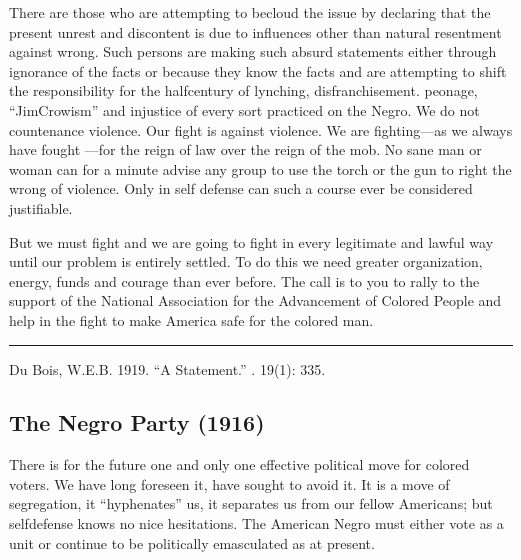 \documentclass[letterpaper,10pt,english]{jupyterBook}
\begin{document}
\sphinxAtStartPar
There are those who are attempting to becloud the issue by declaring that the present unrest and discontent is due to influences other than natural resentment against wrong. Such persons are making such absurd statements either through ignorance of the facts or because they know the facts and are attempting to shift the responsibility for the half\sphinxhyphen{}century of lynching, disfranchisement. peonage, “Jim\sphinxhyphen{}Crowism” and injustice of every sort practiced on the Negro. We do not countenance violence. Our fight is against violence. We are fighting—as we always have fought —for the reign of law over the reign of the mob. No sane man or woman
can for a minute advise any group to use the torch or the gun to right the wrong of violence. Only in self defense can such a course ever be considered justifiable.

\sphinxAtStartPar
But we must fight and we are going to fight in every legitimate and lawful way until our problem is entirely settled. To do this we need greater organization, energy, funds and courage than ever before. The call is to you to rally to the support of the National Association for the Advancement of Colored People and help in the fight to make America safe for the colored man.


\bigskip\hrule\bigskip


\sphinxAtStartPar
{} Du Bois, W.E.B. 1919. “A Statement.” . 19(1): 335.


\subsection{The Negro Party (1916)}
\label{\detokenize{Volumes/12/06/negro_party:the-negro-party-1916}}\label{\detokenize{Volumes/12/06/negro_party::doc}}
\sphinxAtStartPar
There is for the future one and only one effective political move for colored voters. We have long foreseen it, have sought to avoid it. It is a move of segregation, it “hyphenates” us, it separates us from our fellow Americans; but self\sphinxhyphen{}defense knows no nice hesitations. The American Negro must either vote as a unit or continue to be politically emasculated as at present.

\begin{sphinxShadowBox}
\sphinxstylesidebartitle{}

\sphinxAtStartPar
{}
\end{sphinxShadowBox}
\end{document}
